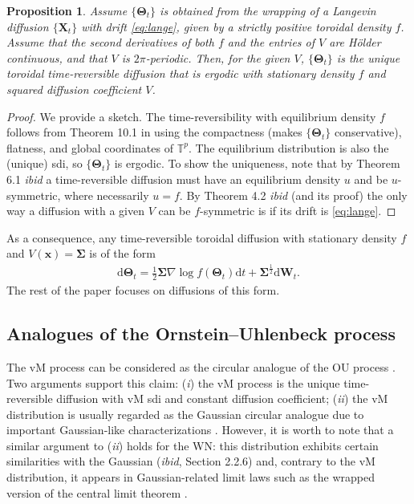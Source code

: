 \documentclass[oneside,11pt]{article}
\newcommand{\rd}{\mathrm{d}}
\newcommand{\bx}{\mathbf{x}}
\newcommand{\bX}{\mathbf{X}}
\newcommand{\bTheta}{\boldsymbol\Theta}
\newcommand{\bSigma}{\boldsymbol\Sigma}
\newcommand{\bW}{\mathbf{W}}
\newtheorem{prop}{Proposition}
\begin{document}
\begin{prop}
\label{prop:lang}
Assume $\{\bTheta_t\}$ is obtained from the wrapping of a Langevin diffusion $\{\bX_t\}$ with drift \eqref{eq:lange}, given by a strictly positive toroidal density $f$. Assume that the second derivatives of both $f$ and the entries of $V$ are H\"{o}lder continuous, and that $V$ is $2\pi$-periodic. Then, for the given $V$, $\{\bTheta_t\}$ is the unique toroidal time-reversi\-ble diffusion that is ergodic with stationary density $f$ and squared diffusion coefficient $V$.
\end{prop}
\begin{proof}
We provide a sketch. The time-reversibility with equilibrium density $f$ follows from
Theorem 10.1 in \cite{Kent1978} using the compactness (makes $\{\bTheta_t\}$ conservative), flatness, and global coordinates of $\mathbb{T}^p$. The equilibrium distribution is also the
(unique) sdi, so $\{\bTheta_t\}$ is ergodic. To show the uniqueness, note that by Theorem 6.1 \textit{ibid} a time-reversible diffusion must have an equilibrium density $u$ and be
$u$-symmetric, where necessarily $u=f$. By Theorem 4.2 \textit{ibid} (and its
proof) the only way a diffusion with a given $V$ can be $f$-symmetric is if its drift is \eqref{eq:lange}.
\end{proof}
As a consequence, any time-reversible toroidal diffusion with stationary density $f$ and $V(\bx)=\bSigma$ is of the form
\begin{align*}
\rd \bTheta_t=\frac{1}{2}\bSigma\nabla\log f(\bTheta_t)\rd t+\bSigma^\frac{1}{2}\rd\bW_t.
\end{align*}
The rest of the paper focuses on diffusions of this form.

\subsection{Analogues of the Ornstein--Uhlenbeck process}

The vM process can be considered as the circular analogue of the OU process \citep{Kent1975}. Two arguments support this claim: (\textit{i}) the vM process is the unique time-reversible diffusion with vM sdi and constant diffusion coefficient; (\textit{ii}) the vM distribution is usually regarded as the Gaussian circular analogue due to important Gaussian-like characterizations \citep[Section 2.2.4]{Jammalamadaka2001}. However, it is worth to note that a similar argument to (\textit{ii}) holds for the WN: this distribution exhibits certain similarities with the Gaussian (\textit{ibid}, Section 2.2.6) and, contrary to the vM distribution, it appears in Gaussian-related limit laws such as the wrapped version of the central limit theorem \citep[Section 4.3.2]{Mardia1972}. \\
\end{document}
